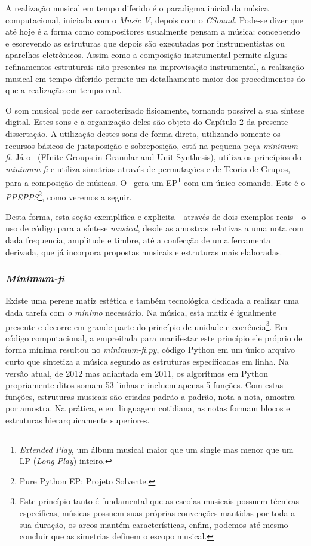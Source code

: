 A realização musical em tempo diferido é o paradigma inicial da música
computacional, iniciada com o \emph{Music V}, depois
com o \emph{CSound}. Pode-se dizer que até hoje é a forma como
compositores usualmente pensam a música: concebendo e escrevendo as
estruturas que depois são executadas por instrumentistas ou aparelhos
eletrônicos.
Assim como a composição instrumental permite alguns refinamentos estruturais não presentes na improvisação instrumental,
a realização musical em
tempo diferido permite um detalhamento maior dos
procedimentos do que a realização em tempo real.


O som musical pode ser caracterizado fisicamente, tornando possível a  sua síntese
digital. Estes sons e a organização deles são objeto do Capítulo 2 da presente dissertação.
A utilização destes sons de forma direta, utilizando somente os recursos básicos de justaposição e sobreposição, está na pequena peça \emph{minimum-fi}. Já o \figgus\ (FInite Groups in Granular and Unit
Synthesis), utiliza os princípios do \emph{minimum-fi} e utiliza simetrias através de
permutações e de Teoria de Grupos, para a composição de músicas.
O \figgus\ gera um
EP\footnote{\emph{Extended Play}, um álbum musical maior que um single mas
menor que um LP (\emph{Long Play}) inteiro.} com um único comando. Este é o
\emph{PPEPPS}\footnote{Pure Python EP: Projeto Solvente.}, como veremos
a seguir.

Desta forma, esta seção exemplifica e explicita - através de dois
exemplos reais - o uso de código para a síntese
\emph{musical}, desde as amostras relativas a uma nota com dada
frequencia, amplitude e timbre, até a confecção de uma ferramenta
derivada, que já incorpora propostas musicais e estruturas mais
elaboradas.

\subsubsection{\emph{Minimum-fi}}

Existe uma perene matiz estética e também tecnológica dedicada a realizar uma
dada tarefa com \emph{o mínimo} necessário.  Na música, esta matiz é
igualmente presente e decorre em grande parte do princípio de unidade
e coerência\footnote{Este princípio tanto é fundamental que as escolas
  musicais possuem técnicas específicas, músicas possuem suas próprias
  convenções mantidas por toda a sua duração, os arcos mantém
  características, enfim, podemos até mesmo concluir que as simetrias
  definem o escopo musical.}. 
  Em código computacional, a empreitada para
manifestar este princípio ele próprio de forma mínima resultou no
\emph{minimum-fi.py}, código Python em um único arquivo curto que
sintetiza a música segundo as estruturas especificadas em
linha. Na versão atual, de
2012 mas adiantada em 2011, os algorítmos em Python propriamente ditos
somam 53 linhas e incluem apenas 5 funções. Com estas funções,
estruturas musicais são criadas padrão a padrão, nota a nota,
amostra por amostra. Na prática, e em linguagem cotidiana,
as notas formam blocos e estruturas hierarquicamente
superiores.

